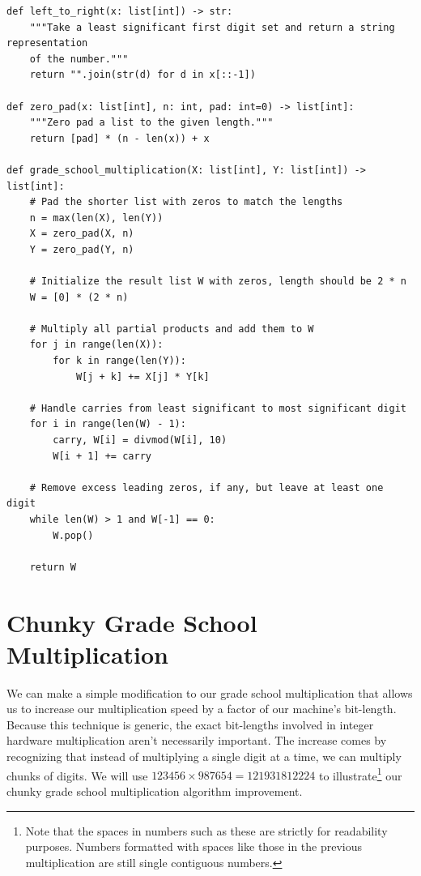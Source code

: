 \documentclass[psamsfonts,reqno]{amsart}
\theoremstyle{definition}
\theoremstyle{remark}
\numberwithin{equation}{section}
\begin{document}
\begin{verbatim}
def left_to_right(x: list[int]) -> str:
    """Take a least significant first digit set and return a string representation
    of the number."""
    return "".join(str(d) for d in x[::-1])
    
def zero_pad(x: list[int], n: int, pad: int=0) -> list[int]:
    """Zero pad a list to the given length."""
    return [pad] * (n - len(x)) + x

def grade_school_multiplication(X: list[int], Y: list[int]) -> list[int]:
    # Pad the shorter list with zeros to match the lengths
    n = max(len(X), len(Y))
    X = zero_pad(X, n)
    Y = zero_pad(Y, n)

    # Initialize the result list W with zeros, length should be 2 * n
    W = [0] * (2 * n)

    # Multiply all partial products and add them to W
    for j in range(len(X)):
        for k in range(len(Y)):
            W[j + k] += X[j] * Y[k]

    # Handle carries from least significant to most significant digit
    for i in range(len(W) - 1):
        carry, W[i] = divmod(W[i], 10)
        W[i + 1] += carry

    # Remove excess leading zeros, if any, but leave at least one digit
    while len(W) > 1 and W[-1] == 0:
        W.pop()

    return W
\end{verbatim}

\section{Chunky Grade School Multiplication}

We can make a simple modification to our grade school multiplication that allows us to increase our multiplication speed by a factor of our machine's bit-length. Because this technique is generic, the exact bit-lengths involved in integer hardware multiplication aren't necessarily important. The increase comes by recognizing that instead of multiplying a single digit at a time, we can multiply chunks of digits. We will use $\num{123456} \times \num{987654} = \num{121931812224}$ to illustrate\footnote{Note that the spaces in numbers such as these are strictly for readability purposes. Numbers formatted with spaces like those in the previous multiplication are still single contiguous numbers.} our chunky grade school multiplication algorithm improvement.
\end{document}
